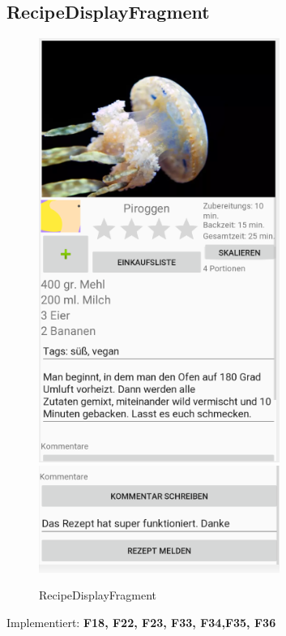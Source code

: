 \subsection{RecipeDisplayFragment}
\begin{figure}[H]
	\centering
	\includegraphics[width=0.7\textwidth]{pics/recipeDisplayFragment.png}%
	\newline
    \includegraphics[width=0.7\textwidth]{pics/recipeDisplayFragmentzwei.png}%
	\caption{RecipeDisplayFragment}%
	\label{view}%
\end{figure}
Implementiert: \textbf{F18, F22, F23, F33, F34,F35, F36}
